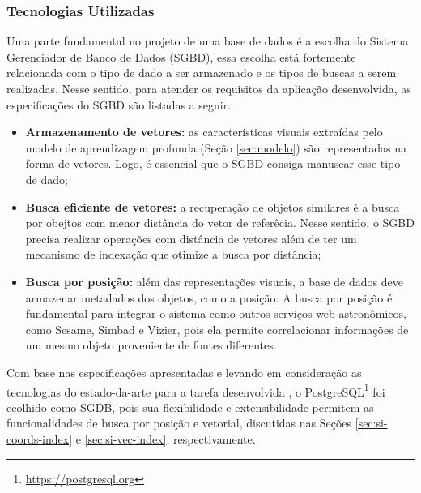 


\subsubsection{Tecnologias Utilizadas}
\label{sec:si-tecnologias}

Uma parte fundamental no projeto de uma base de dados é a escolha do Sistema Gerenciador de Banco de Dados (SGBD), essa escolha está fortemente relacionada com o tipo de dado a ser armazenado e os tipos de buscas a serem realizadas. Nesse sentido, para atender os requisitos da aplicação desenvolvida, as especificações do SGBD são listadas a seguir.

\begin{itemize}
  \item \textbf{Armazenamento de vetores:} as características visuais extraídas pelo modelo de aprendizagem profunda (Seção \ref{sec:modelo}) são representadas na forma de vetores. Logo, é essencial que o SGBD  consiga manusear esse tipo de dado;
  \item \textbf{Busca eficiente de vetores:} a recuperação de objetos similares é a busca por obejtos com menor distância do vetor de referêcia. Nesse sentido, o SGBD precisa realizar operações com distância de vetores além de ter um mecanismo de indexação que otimize a busca por distância;
  \item \textbf{Busca por posição:} além das representações visuais, a base de dados deve armazenar metadados dos objetos, como a posição. A busca por posição é fundamental para integrar o sistema como outros serviços web astronômicos, como Sesame, Simbad e Vizier, pois ela permite correlacionar informações de um mesmo objeto proveniente de fontes diferentes.
\end{itemize}

Com base nas especificações apresentadas e levando em consideração as tecnologias do estado-da-arte para a tarefa desenvolvida \cite{pan2024}, o PostgreSQL\footnote{\url{https://postgresql.org}} foi ecolhido como SGDB, pois sua flexibilidade e extensibilidade permitem as funcionalidades de busca por posição e vetorial, discutidas nas Seções \ref{sec:si-coords-index} e \ref{sec:si-vec-index}, respectivamente.



